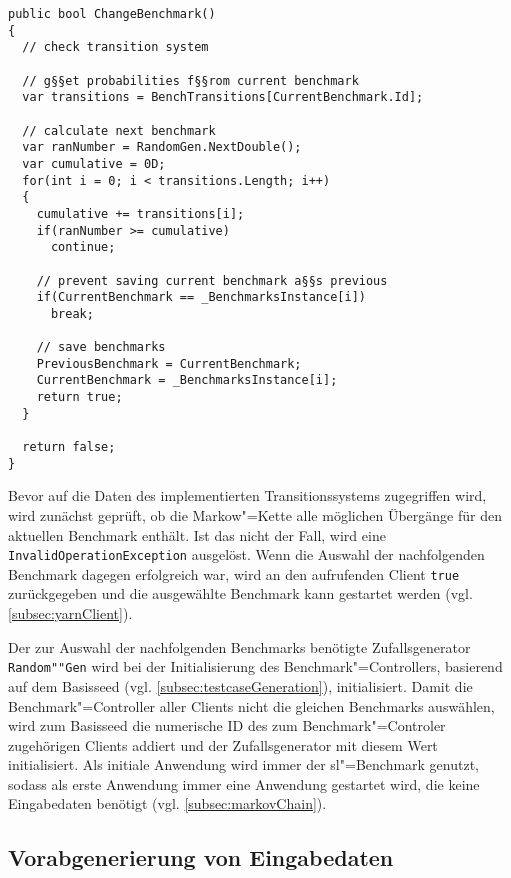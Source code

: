 \begin{lstlisting}[label=lst:benchmarkChanging,style=cs,
caption={[Auswahl des nachfolgenden Benchmarks durch ChangeBenchmark()]
    Auswahl des nachfolgenden Benchmarks durch \texttt{ChangeBenchmark()} (gekürzt)}]
public bool ChangeBenchmark()
{
  // check transition system
  
  // g§§et probabilities f§§rom current benchmark
  var transitions = BenchTransitions[CurrentBenchmark.Id];
  
  // calculate next benchmark
  var ranNumber = RandomGen.NextDouble();
  var cumulative = 0D;
  for(int i = 0; i < transitions.Length; i++)
  {
    cumulative += transitions[i];
    if(ranNumber >= cumulative)
      continue;
    
    // prevent saving current benchmark a§§s previous
    if(CurrentBenchmark == _BenchmarksInstance[i])
      break;
    
    // save benchmarks
    PreviousBenchmark = CurrentBenchmark;
    CurrentBenchmark = _BenchmarksInstance[i];
    return true;
  }
  
  return false;
}
\end{lstlisting}

Bevor auf die Daten des implementierten Transitionssystems zugegriffen wird, wird zunächst geprüft, ob die Markow"=Kette alle möglichen Übergänge für den aktuellen Benchmark enthält.
Ist das nicht der Fall, wird eine \texttt{InvalidOperationException} ausgelöst.
Wenn die Auswahl der nachfolgenden Benchmark dagegen erfolgreich war, wird an den aufrufenden Client \texttt{true} zurückgegeben und die ausgewählte Benchmark kann gestartet werden (vgl. \cref{subsec:yarnClient}).

Der zur Auswahl der nachfolgenden Benchmarks benötigte Zufallsgenerator \texttt{Random""Gen} wird bei der Initialisierung des Benchmark"=Controllers, basierend auf dem Basisseed (vgl. \cref{subsec:testcaseGeneration}), initialisiert.
Damit die Benchmark"=Controller aller Clients nicht die gleichen Benchmarks auswählen, wird zum Basisseed die numerische ID des zum Benchmark"=Controler zugehörigen Clients addiert und der Zufallsgenerator mit diesem Wert initialisiert.
Als initiale Anwendung wird immer der \acrlong{sl}"=Benchmark genutzt, sodass als erste Anwendung immer eine Anwendung gestartet wird, die keine Eingabedaten benötigt (vgl. \cref{subsec:markovChain}).

\subsection{Vorabgenerierung von Eingabedaten}
\label{subsec:precreateInputData}


